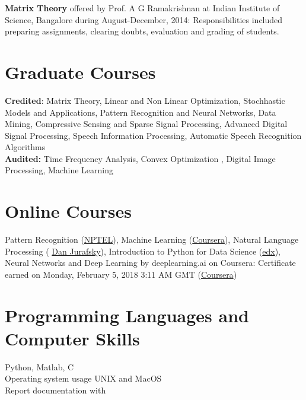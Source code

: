 \documentclass[line]{resume}
\begin{document}
{\begin{resume}
		\textbf{Matrix Theory}  offered  by Prof. A G Ramakrishnan at  Indian Institute of Science, Bangalore during 
		August-December, 2014: Responsibilities included   preparing assignments, clearing doubts, evaluation and grading of students.
		\vspace{1mm}
			\vspace{-1.5mm}
			
			\vspace{-2.5mm}
			\section{\mysidestyle Graduate Courses} 
			\vspace{2.5mm}
		\textbf{Credited}:	Matrix Theory,
			Linear and Non Linear Optimization, Stochhastic Models and Applications,		
			Pattern Recognition and Neural Networks, Data Mining, Compressive Sensing and Sparse Signal Processing, 	Advanced Digital Signal Processing, Speech Information Processing, Automatic Speech Recognition Algorithms\\
			\textbf{Audited: } Time Frequency Analysis, Convex Optimization , Digital Image Processing, Machine Learning
			
						\section{\mysidestyle Online Courses} 
						Pattern Recognition (\href{http://nptel.ac.in/courses/117108048/#}{NPTEL}), Machine Learning (\href{https://www.coursera.org/learn/machine-learning/home/welcome}{Coursera}), Natural Language Processing ( \href{https://www.youtube.com/playlist?list=PL6397E4B26D00A269}{Dan Jurafsky}), Introduction to Python for Data Science (\href{https://courses.edx.org/courses/course-v1:Microsoft+DAT208x+2T2017/course/}{edx}),  Neural Networks and Deep Learning by deeplearning.ai on Coursera: Certificate earned on Monday, February 5, 2018 3:11 AM GMT (\href{https://www.coursera.org/account/accomplishments/records/QSWQJRUQ47AX}{Coursera})
						
						
			\vspace{-3.5mm}
			\section{\mysidestyle Programming Languages and Computer Skills} 
			\vspace{2.5mm}
			 Python, Matlab, C \vspace{1mm}\\
			Operating system usage UNIX and MacOS \vspace{1mm}\\
			Report documentation with \LaTeXe
			\vspace{-2.5mm}

\end{resume}}
\end{document}
